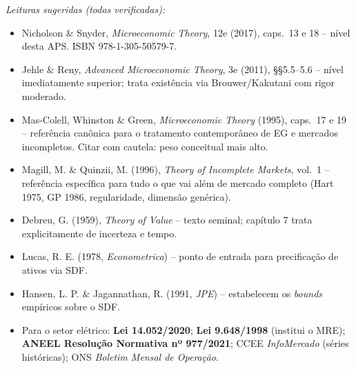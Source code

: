 \documentclass[11pt,addpoints]{exam}
\begin{document}
\vspace{1em}
\begin{contextbox}
\small
\textit{Leituras sugeridas (todas verificadas):}
\begin{itemize}[noitemsep,topsep=0pt]
\item Nicholson \& Snyder, \textit{Microeconomic Theory}, 12e (2017), caps.~13 e 18 -- nível desta APS. ISBN 978-1-305-50579-7.
\item Jehle \& Reny, \textit{Advanced Microeconomic Theory}, 3e (2011), §§5.5--5.6 -- nível imediatamente superior; trata existência via Brouwer/Kakutani com rigor moderado.
\item Mas-Colell, Whinston \& Green, \textit{Microeconomic Theory} (1995), caps.~17 e 19 -- referência canônica para o tratamento contemporâneo de EG e mercados incompletos. Citar com cautela: peso conceitual mais alto.
\item Magill, M. \& Quinzii, M. (1996), \textit{Theory of Incomplete Markets}, vol.~1 -- referência específica para tudo o que vai além de mercado completo (Hart 1975, GP 1986, regularidade, dimensão genérica).
\item Debreu, G. (1959), \textit{Theory of Value} -- texto seminal; capítulo 7 trata explicitamente de incerteza e tempo.
\item Lucas, R. E. (1978, \textit{Econometrica}) -- ponto de entrada para precificação de ativos via SDF.
\item Hansen, L. P. \& Jagannathan, R. (1991, \textit{JPE}) -- estabelecem os \emph{bounds} empíricos sobre o SDF.
\item Para o setor elétrico: \textbf{Lei 14.052/2020}; \textbf{Lei 9.648/1998} (institui o MRE); \textbf{ANEEL Resolução Normativa nº 977/2021}; CCEE \emph{InfoMercado} (séries históricas); ONS \emph{Boletim Mensal de Operação}.
\end{itemize}
\end{contextbox}
\end{document}
